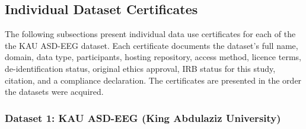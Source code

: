 \subsection{Individual Dataset Certificates}
\label{sec:individual_certificates}

The following subsections present individual data use certificates for each of the the KAU ASD-EEG dataset. Each certificate documents the dataset's full name, domain, data type, participants, hosting repository, access method, licence terms, de-identification status, original ethics approval, IRB status for this study, citation, and a compliance declaration. The certificates are presented in the order the datasets were acquired.

\subsubsection*{Dataset 1: KAU ASD-EEG (King Abdulaziz University)}
\label{sec:cert_kau_asd_eeg}

